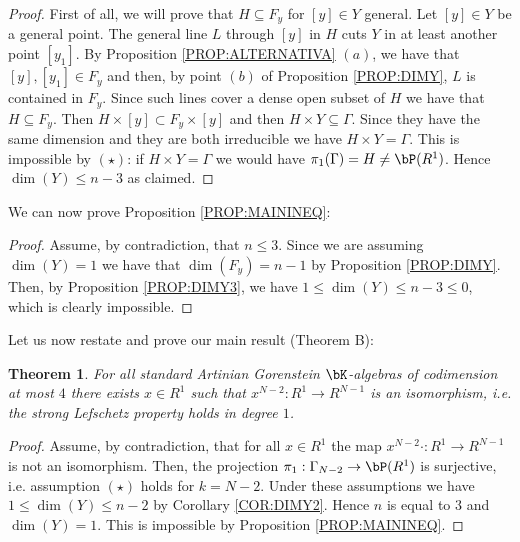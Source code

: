 \documentclass[a4paper,11pt]{amsart}
\newtheorem{theorem}{Theorem}[section]
\begin{document}
\begin{proof}
First of all, we will prove that $H\subseteq F_y$ for $[y]\in Y$ general. Let $[y]\in Y$ be a general point. The general line $L$ through $[y]$ in $H$ cuts $Y$ in at least another point $[y_1]$. By Proposition \ref{PROP:ALTERNATIVA} $(a)$, we have that $[y],[y_1]\in F_{y}$ and then, by point $(b)$ of Proposition \ref{PROP:DIMY}, $L$ is contained in $F_y$. Since such lines cover a dense open subset of $H$ we have that $H\subseteq F_y$.
Then $H\times[y]\subset F_y\times [y]$ and  then $H\times Y\subseteq \Gamma$. Since they have the same dimension and they are both irreducible we have $H\times Y=\Gamma$. This is impossible by $(\star)$: if $H\times Y=\Gamma$ we would have $\pi_1(\Gamma)=H\neq \bP(R^1)$. Hence $\dim(Y)\leq n-3$ as claimed.
\end{proof}

We can now prove Proposition \ref{PROP:MAININEQ}: 
\begin{proof} Assume, by contradiction, that $n\leq 3$. Since we are assuming $\dim(Y)=1$ we have that $\dim(F_y)=n-1$ by Proposition \ref{PROP:DIMY}. Then, by Proposition \ref{PROP:DIMY3}, we have $1\leq \dim(Y)\leq n-3\leq 0$, which is clearly impossible.
\end{proof}

Let us now restate and prove our main result (Theorem B):

\begin{theorem}
\label{THM:LEFSCHETZ1}
For all standard Artinian Gorenstein $\bK$-algebras of codimension at most $4$
there exists $x\in R^1$ such that $x^{N-2}:R^1\to R^{N-1}$ is an isomorphism, i.e. the strong Lefschetz property holds in degree $1$.
\end{theorem}

\begin{proof}
Assume, by contradiction, that for all $x\in R^1$ the map $x^{N-2}\cdot :R^1\to R^{N-1}$ is not an isomorphism. Then, the projection $\pi_1:\Gamma_{N-2}\to \bP(R^1)$ is surjective, i.e. assumption $(\star)$ holds for $k=N-2$. Under these assumptions we have $1\leq \dim(Y)\leq n-2$ by Corollary \ref{COR:DIMY2}. Hence $n$ is equal to $3$ and $\dim(Y)=1$. This is impossible by Proposition \ref{PROP:MAININEQ}.
\end{proof}


\end{document}
